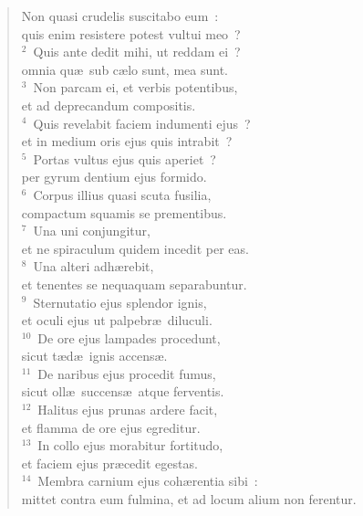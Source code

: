 \begin{flushleft}\begin{verse}\vspace{-19pt}\hspace{6pt}Non quasi crudelis suscitabo eum~:\\\hspace{6pt} quis enim resistere potest vultui meo~?\\
${}^{2}$~Quis ante dedit mihi, ut reddam ei~?\\ omnia qu\ae\ sub c\ae lo sunt, mea sunt.\\
${}^{3}$~Non parcam ei, et verbis potentibus,\\ et ad deprecandum compositis.\\
${}^{4}$~Quis revelabit faciem indumenti ejus~?\\ et in medium oris ejus quis intrabit~?\\
${}^{5}$~Portas vultus ejus quis aperiet~?\\ per gyrum dentium ejus formido.\\
${}^{6}$~Corpus illius quasi scuta fusilia,\\ compactum squamis se prementibus.\\
${}^{7}$~Una uni conjungitur,\\ et ne spiraculum quidem incedit per eas.\\
${}^{8}$~Una alteri adh\ae rebit,\\ et tenentes se nequaquam separabuntur.\\
${}^{9}$~Sternutatio ejus splendor ignis,\\ et oculi ejus ut palpebr\ae\ diluculi.\\
${}^{10}$~De ore ejus lampades procedunt,\\ sicut t\ae d\ae\ ignis accens\ae .\\
${}^{11}$~De naribus ejus procedit fumus,\\ sicut oll\ae\ succens\ae\ atque ferventis.\\
${}^{12}$~Halitus ejus prunas ardere facit,\\ et flamma de ore ejus egreditur.\\
${}^{13}$~In collo ejus morabitur fortitudo,\\ et faciem ejus pr\ae cedit egestas.\\
${}^{14}$~Membra carnium ejus coh\ae rentia sibi~:\\ mittet contra eum fulmina, et ad locum alium non ferentur.\\

\end{verse}
\end{flushleft}
